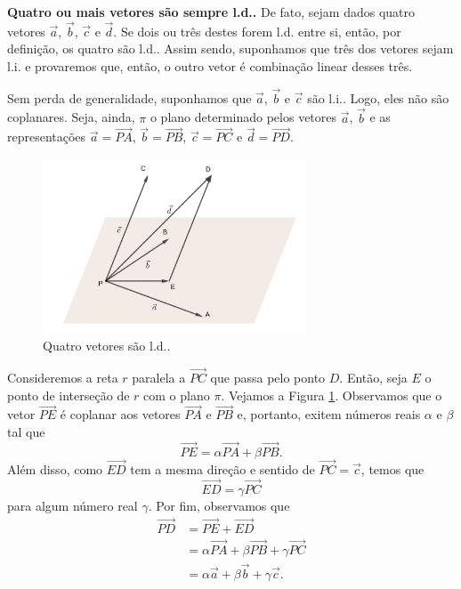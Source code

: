 {\bf Quatro ou mais vetores são sempre l.d..} De fato, sejam dados quatro vetores $\vec{a}$, $\vec{b}$, $\vec{c}$ e $\vec{d}$. Se dois ou três destes forem l.d. entre si, então, por definição, os quatro são l.d.. Assim sendo, suponhamos que três dos vetores sejam l.i. e provaremos que, então, o outro vetor é combinação linear desses três.

Sem perda de generalidade, suponhamos que $\vec{a}$, $\vec{b}$ e $\vec{c}$ são l.i.. Logo, eles não são coplanares. Seja, ainda, $\pi$ o plano determinado pelos vetores $\vec{a}$, $\vec{b}$ e as representações $\vec{a}=\overrightarrow{PA}$, $\vec{b}=\overrightarrow{PB}$, $\vec{c}=\overrightarrow{PC}$ e $\vec{d}=\overrightarrow{PD}$.

\begin{figure}[H]
  \centering
  \includegraphics[width=0.7\textwidth]{./cap_base/dados/fig_4vec_ld/fig_4vec_ld}
  \caption{Quatro vetores são l.d..}
  \label{fig:4vec_ld}
\end{figure}

Consideremos a reta $r$ paralela a $\overrightarrow{PC}$ que passa pelo ponto $D$. Então, seja $E$ o ponto de interseção de $r$ com o plano $\pi$. Vejamos a Figura \ref{fig:4vec_ld}. Observamos que o vetor $\overrightarrow{PE}$ é coplanar aos vetores $\overrightarrow{PA}$ e $\overrightarrow{PB}$ e, portanto, exitem números reais $\alpha$ e $\beta$ tal que
\begin{equation}
  \overrightarrow{PE} = \alpha\overrightarrow{PA} + \beta\overrightarrow{PB}.
\end{equation}
Além disso, como $\overrightarrow{ED}$ tem a mesma direção e sentido de $\overrightarrow{PC} = \vec{c}$, temos que
\begin{equation}
  \overrightarrow{ED} = \gamma\overrightarrow{PC}
\end{equation}
para algum número real $\gamma$. Por fim, observamos que
\begin{align*}
  \overrightarrow{PD} &= \overrightarrow{PE} + \overrightarrow{ED}\\
                      &= \alpha\overrightarrow{PA} + \beta\overrightarrow{PB} + \gamma\overrightarrow{PC}\\
                      &= \alpha\vec{a} + \beta\vec{b} + \gamma\vec{c}.
\end{align*}

